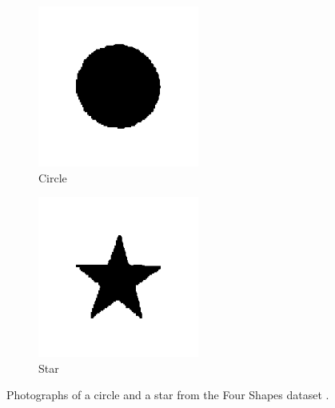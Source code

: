 \begin{figure}[ht!]
    \centering
    \begin{subfigure}[t]{0.25\textwidth}
        \includegraphics[width=\textwidth]{Figures/datasets/circle.png}
        \caption{Circle}
    \end{subfigure}
    \begin{subfigure}[t]{0.25\textwidth}
        \includegraphics[width=\textwidth]{Figures/datasets/star.png}
        \caption{Star}
    \end{subfigure}
    \caption[Photographs of a circle and a star from the Four Shapes dataset]{Photographs of a circle and a star from the Four Shapes dataset \cite{kaggleFourShapes}.}
    \label{fig:four_shapes}
\end{figure}

